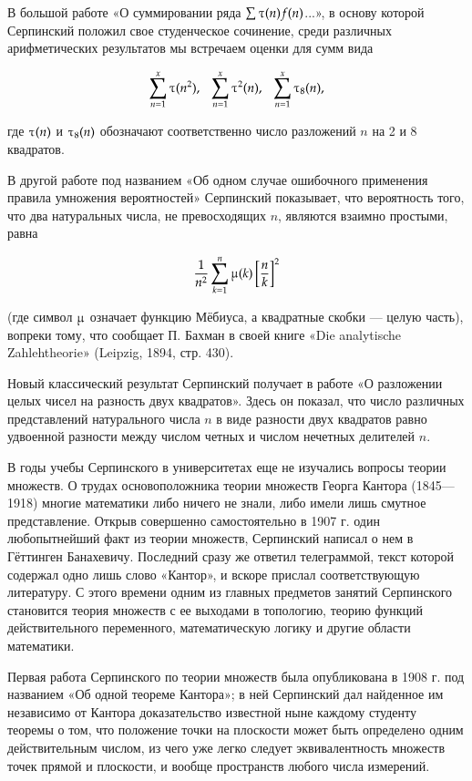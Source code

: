 \documentclass[12pt, a4paper, openany]{book}
\begin{document}
	В большой работе «О суммировании ряда $ \sum \tauup(n)f(n)$...», в основу которой Серпинский положил свое студенческое сочинение, среди различных арифметических результатов мы встречаем оценки для сумм вида
	
	$$
	\sum_{n=1}^{x} \tauup(n^2),\ \ \  	\sum_{n=1}^{x} \tauup^2(n),\ \ \ \sum_{n=1}^{x} \tauup_8(n),
	$$
	
\noindent	где $\tauup(n)$ и $\tauup_8(n)$ обозначают соответственно число разложений $n$ на 2 и 8 квадратов.

В другой работе под названием «Об одном случае ошибочного применения правила умножения вероятностей» Серпинский показывает, что вероятность того, что два натуральных числа, не превосходящих $n$, являются взаимно простыми, равна

$$
\frac{1}{n^2} \sum_{k=1}^{n} \muup(k) \left[ \frac{n}{k} \right]^2
$$

\noindent (где символ $\muup$ означает функцию Мёбиуса, а квадратные скобки — целую часть), вопреки тому, что сообщает П. Бахман в своей книге «Die analytische Zahlehtheorie» (Leipzig, 1894, стр. 430).

Новый классический результат Серпинский получает в работе «О разложении целых чисел на разность двух квадратов». Здесь он показал, что число различных представлений натурального числа $n$ в виде разности двух квадратов равно удвоенной разности между числом четных и числом нечетных делителей $n$.

В годы учебы Серпинского в университетах еще не изучались вопросы теории множеств. О трудах основоположника теории множеств Георга Кантора (1845—1918) многие математики либо ничего не знали, либо имели лишь смутное представление. Открыв совершенно самостоятельно в 1907 г. один любопытнейший факт из теории множеств, Серпинский написал о нем в Гёттинген Банахевичу. Последний сразу же ответил телеграммой, текст которой содержал одно лишь слово «Кантор», и вскоре прислал соответствующую литературу. С этого времени одним из главных предметов занятий Серпинского становится теория множеств с ее выходами в топологию, теорию функций действительного переменного, математическую логику и другие области математики.

Первая работа Серпинского по теории множеств была опубликована в 1908 г. под названием «Об одной теореме Кантора»; в ней Серпинский дал найденное им независимо от Кантора доказательство известной ныне каждому студенту теоремы о том, что положение точки на плоскости может быть определено одним действительным числом, из чего уже легко следует эквивалентность множеств точек прямой и плоскости, и вообще пространств любого числа измерений.
\end{document}
